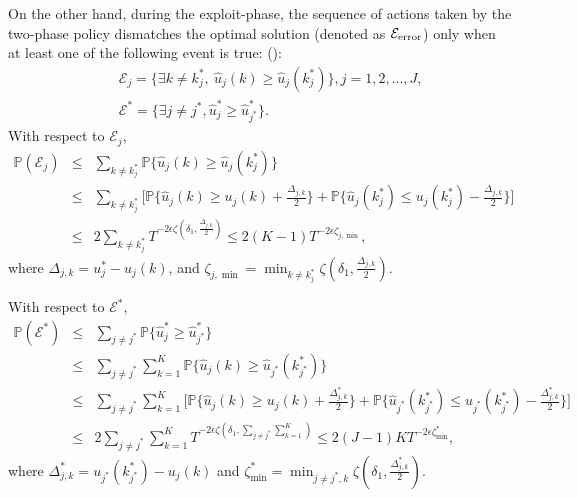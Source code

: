 On the other hand, during the exploit-phase, the sequence of actions taken by the two-phase policy dismatches the optimal solution (denoted as $\mathcal{E}_{\rm error}$) only when at least one of the following event is true: ():
\begin{eqnarray}
&&\mathcal{E}_{j} = \{\exists k \neq k_j^*,~\hat{u}_j(k) \geq \hat{u}_j(k_j^*)\}, j = 1,2,\ldots, J,\label{eq:viol_each} \\
&&\mathcal{E}^* = \{\exists j \neq j^*, \hat{u}_j^* \geq \hat{u}_{j^*}^*\}\label{eq:viol_opt}.
\end{eqnarray}
With respect to $\mathcal{E}_{j}$,
\begin{eqnarray}
\mathbb{P}(\mathcal{E}_{j}) &\leq& \sum_{k\neq k_j^*}\mathbb{P} \{\hat{u}_j(k) \geq \hat{u}_j(k_j^*)\}\nonumber \\
&\leq & \sum_{k\neq k_j^*}\big[\mathbb{P} \{\hat{u}_j(k) \geq u_j(k) + \frac{\Delta_{j,k}}{2}\} + \mathbb{P} \{\hat{u}_j(k_j^*) \leq {u}_j(k_j^*) - \frac{\Delta_{j,k}}{2}\}\big] \nonumber \\
& \leq & 2 \sum_{k\neq k_j^*} T^{-2 \epsilon \zeta(\delta_1, \frac{\Delta_{j,k}}{2})}\leq 2(K-1)T^{-2 \epsilon \zeta_{j, \min}},
\end{eqnarray}
where $\Delta_{j,k} = u_j^* - u_j(k)$, and $\zeta_{j, \min} = \min_{k \neq k_j^*}\zeta(\delta_1, \frac{\Delta_{j,k}}{2})$.

With respect to $\mathcal{E}^*$,
\begin{eqnarray}
\mathbb{P}(\mathcal{E}^*) &\leq& \sum_{j\neq j^*}\mathbb{P} \{\hat{u}_j^* \geq \hat{u}_{j^*}^*\}\nonumber \\
&\leq & \sum_{j\neq j^*} \sum_{k=1}^K \mathbb{P} \{\hat{u}_j(k) \geq \hat{u}_{j^*}(k_{j^*}^*)\}\nonumber\nonumber \\
&\leq & \sum_{j\neq j^*} \sum_{k=1}^K\big[ \mathbb{P} \{\hat{u}_j(k) \geq u_j(k) + \frac{\Delta^*_{j,k}}{2} \} + \mathbb{P}\{ \hat{u}_{j^*}(k_{j^*}^*) \leq {u}_{j^*}(k_{j^*}^*) - \frac{\Delta^*_{j,k}}{2}\} \big]\nonumber \\
&\leq & 2\sum_{j\neq j^*} \sum_{k=1}^K T^{-2 \epsilon \zeta(\delta_1,\sum_{j\neq j^*} \sum_{k=1}^K )} \leq 2(J-1)K T^{-2\epsilon \zeta^*_{\min}},
\end{eqnarray}
where $\Delta^*_{j,k} = {u}_{j^*}(k_{j^*}^*) - u_j(k)$ and $\zeta^*_{\min} = \min_{j\neq j^*, k}\zeta(\delta_1,\frac{\Delta^*_{j,k}}{2})$.


